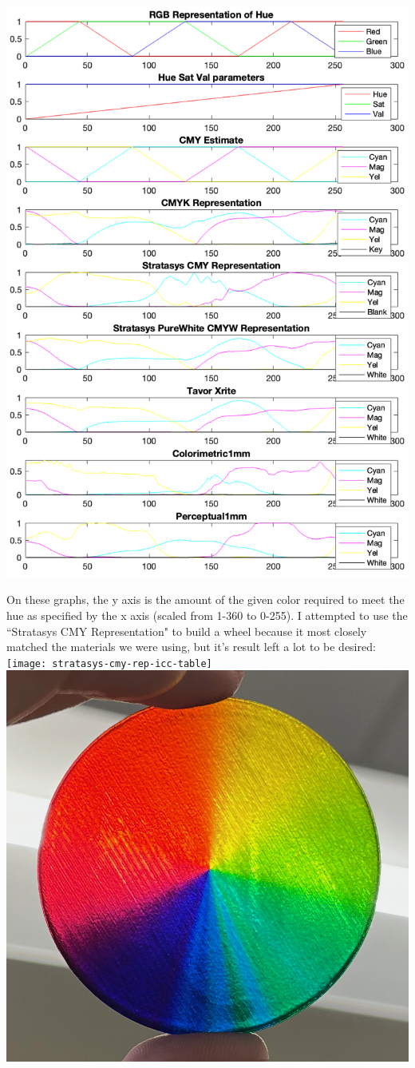 \documentclass{article}
\begin{document}
\begin{multicols}{2}
\noindent
\includegraphics[width=\columnwidth]{color-correction-graphs}

\noindent
On these graphs, the y axis is the amount of the given color required to meet the hue as specified by the x axis (scaled from 1-360 to 0-255). I attempted to use the ``Stratasys CMY Representation" to build a wheel because it most closely matched the materials we were using, but it's result left a lot to be desired:
\\

\noindent
\texttt{[image: stratasys-cmy-rep-icc-table]}
\includegraphics[width=0.517\columnwidth]{stratasys-cmy-rep-icc}
\


\end{multicols}
\end{document}
